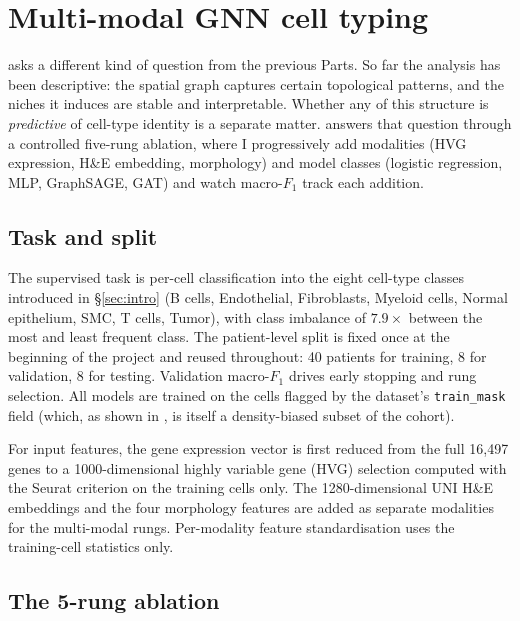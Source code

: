 \section{Multi-modal GNN cell typing}
\label{sec:part3}

 asks a different kind of question from the previous Parts. So far the analysis has been descriptive: the spatial graph captures certain topological patterns, and the niches it induces are stable and interpretable. Whether any of this structure is \emph{predictive} of cell-type identity is a separate matter.  answers that question through a controlled five-rung ablation, where I progressively add modalities (HVG expression, H\&E embedding, morphology) and model classes (logistic regression, MLP, GraphSAGE, GAT) and watch macro-$F_1$ track each addition.

\subsection*{Task and split}

The supervised task is per-cell classification into the eight cell-type classes introduced in \S\ref{sec:intro} (B cells, Endothelial, Fibroblasts, Myeloid cells, Normal epithelium, SMC, T cells, Tumor), with class imbalance of $7.9\times$ between the most and least frequent class. The patient-level split is fixed once at the beginning of the project and reused throughout: 40 patients for training, 8 for validation, 8 for testing. Validation macro-$F_1$ drives early stopping and rung selection. All models are trained on the cells flagged by the dataset's \texttt{train\_mask} field (which, as shown in , is itself a density-biased subset of the cohort).

For input features, the gene expression vector is first reduced from the full 16{,}497 genes to a 1000-dimensional highly variable gene (HVG) selection computed with the Seurat criterion \cite{stuart2019seurat,wolf2018scanpy} on the training cells only. The 1280-dimensional UNI H\&E embeddings and the four morphology features are added as separate modalities for the multi-modal rungs. Per-modality feature standardisation uses the training-cell statistics only.

\subsection*{The 5-rung ablation}

